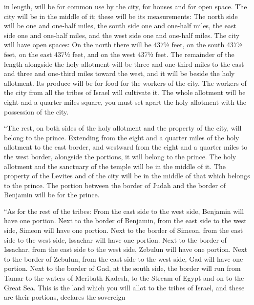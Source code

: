 {in
length, will be for common
use
by the city,
for houses and for open space.
The city
will be in the middle of it;
these
will be its measurements: The north
side
will be one and one-half miles,
the south
side
one and one-half miles,
the east
side
one and one-half miles,
and the west
side
one and one-half miles.
The city
will have open spaces: On the north
there will be
437½ feet,
on the south
437½ feet,
on the east
437½ feet,
and on the west
437½ feet.
The remainder
of the length
alongside
the holy
allotment
will be three and one-third miles
to the east
and three and one-third miles
toward the west,
and it will be
beside
the holy
allotment.
Its produce
will be
for food
for the workers
of the city.
The workers
of the city
from all
the tribes
of Israel
will cultivate it.
The whole
allotment
will be eight and a quarter miles
square,
you must set apart
the holy
allotment
with
the possession
of the city.
\par }{\PP {}“The rest,
on both sides
of the holy
allotment
and the property
of the city,
will belong to
the prince.
Extending from
the eight and a quarter miles
of the holy allotment
to
the east
border,
and westward
from
the eight and a quarter miles
to
the west
border,
alongside
the portions,
it will belong
to the prince.
The holy
allotment
and the sanctuary
of the temple
will be in the middle of it.
The property
of the Levites
and of the city
will be
in the middle
of that which
belongs to the prince.
The portion between
the border
of Judah
and the border
of Benjamin
will be
for the prince.
\par }{\PP {}“As for the rest
of the tribes: From
the east
side
to the west
side, Benjamin
will have one portion.
Next to the border
of Benjamin,
from
the east
side
to the west
side, Simeon
will have one portion.
Next to the border
of Simeon,
from
the east
side
to the west
side, Issachar
will have one portion.
Next to the border
of Issachar,
from
the east
side
to the west
side, Zebulun
will have one portion.
Next to the border
of Zebulun,
from
the east
side
to the west
side, Gad
will have one portion.
Next to
the border
of Gad,
at the south
side,
the border
will run
from Tamar
to the waters
of Meribath
Kadesh,
to the Stream
of Egypt and on
to the Great
Sea.
This
is the land
which
you will
allot
to the tribes
of Israel,
and these
are their portions,
declares
the sovereign

}
